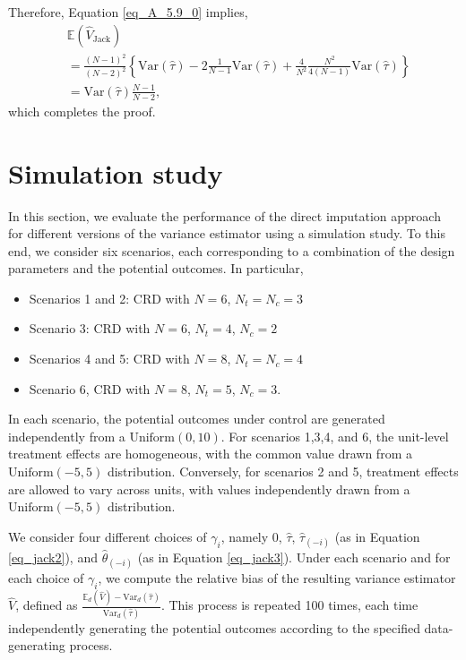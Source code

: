 \documentclass[12pt]{article}
\newcommand{\Var}{{\text{Var}}}
\newcommand{\E}{{\mathbb{E}}}
\begin{document}
Therefore, Equation \ref{eq_A_5.9_0} implies,
\begin{align}
& \E(\hat{V}_{\text{Jack}}) \nonumber \\
& = \frac{(N-1)^2}{(N-2)^2}\left\{\Var(\hat{\tau}) -2 \frac{1}{N-1}\Var(\hat{\tau}) + \frac{4}{N^2}\frac{N^2}{4(N-1)} \Var(\hat{\tau})  \right\} \nonumber\\
& = \Var(\hat{\tau}) \frac{N-1}{N-2},
\end{align}
which completes the proof. 


\section{Simulation study}
\label{sec_simulation}

In this section, we evaluate the performance of the direct imputation approach for different versions of the variance estimator using a simulation study. To this end, we consider six scenarios, each corresponding to a combination of the design parameters and the potential outcomes. In particular,
\begin{itemize}
    \item Scenarios 1 and 2: CRD with $N = 6$, $N_t = N_c = 3$
    \item Scenario 3: CRD with $N = 6$, $N_t = 4$, $N_c = 2$
    \item Scenarios 4 and 5: CRD with $N = 8$, $N_t = N_c = 4$
    \item Scenario 6, CRD with $N = 8$, $N_t = 5$, $N_c = 3$.
\end{itemize}
In each scenario, the potential outcomes under control are generated independently from a $\text{Uniform}(0,10)$. For scenarios 1,3,4, and 6, the unit-level treatment effects are homogeneous, with the common value drawn from a $\text{Uniform}(-5,5)$ distribution. Conversely, for scenarios 2 and 5, treatment effects are allowed to vary across units, with values independently drawn from a $\text{Uniform}(-5,5)$ distribution.

We consider four different choices of $\gamma_i$, namely $0$, $\hat{\tau}$, $\hat{\tau}_{(-i)}$ (as in Equation \ref{eq_jack2}), and $\hat{\theta}_{(-i)}$ (as in Equation \ref{eq_jack3}). Under each scenario and for each choice of $\gamma_i$, we compute the relative bias of the resulting variance estimator $\hat{V}$, defined as $\frac{\E_d(\hat{V}) - \Var_d(\hat{\tau})}{\Var_d(\hat{\tau})}$. This process is repeated 100 times, each time independently generating the potential outcomes according to the specified data-generating process. 
\end{document}
